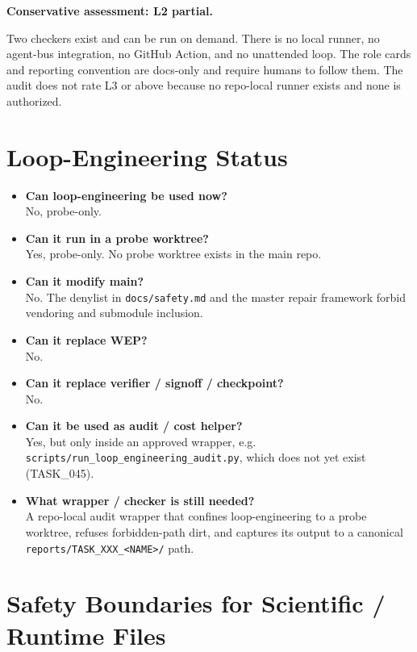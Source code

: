 \documentclass[11pt,a4paper]{article}
\begin{document}
\textbf{Conservative assessment: L2 partial.}

Two checkers exist and can be run on demand. There is no local runner,
no agent-bus integration, no GitHub Action, and no unattended loop. The
role cards and reporting convention are docs-only and require humans to
follow them. The audit does not rate L3 or above because no repo-local
runner exists and none is authorized.

\section{Loop-Engineering Status}

\begin{itemize}[leftmargin=2em]
  \item \textbf{Can loop-engineering be used now?} \\
        No, probe-only.
  \item \textbf{Can it run in a probe worktree?} \\
        Yes, probe-only. No probe worktree exists in the main repo.
  \item \textbf{Can it modify main?} \\
        No. The denylist in \texttt{docs/safety.md} and the master
        repair framework forbid vendoring and submodule inclusion.
  \item \textbf{Can it replace WEP?} \\
        No.
  \item \textbf{Can it replace verifier / signoff / checkpoint?} \\
        No.
  \item \textbf{Can it be used as audit / cost helper?} \\
        Yes, but only inside an approved wrapper, e.g.
        \texttt{scripts/run\_loop\_engineering\_audit.py}, which does
        not yet exist (TASK\_045).
  \item \textbf{What wrapper / checker is still needed?} \\
        A repo-local audit wrapper that confines loop-engineering to a
        probe worktree, refuses forbidden-path dirt, and captures its
        output to a canonical \texttt{reports/TASK\_XXX\_<NAME>/} path.
\end{itemize}

\section{Safety Boundaries for Scientific / Runtime Files}
\end{document}
